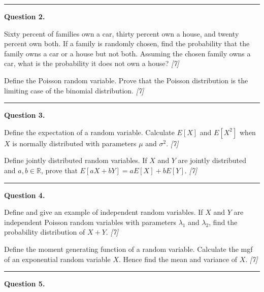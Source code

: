 \documentclass[11pt,a4paper]{article}
\newcommand{\pts}[1]{\hfill   \textit{[#1]}}
\begin{document}
\medskip\rule{\linewidth}{0.2pt}

\medskip


\noindent   \textbf{Question 2.}

\begin{parts}
  \item Sixty percent of families own a car, thirty percent own a house, and twenty percent own both. If a family is randomly chosen, find the probability that the family owns a car or a house but not both. Assuming the chosen family owns a car, what is the probability it does not own a house? \pts{7}
  \item Define the Poisson random variable. Prove that the Poisson distribution is the limiting case of the binomial distribution. \pts{7}
\end{parts}

\medskip\rule{\linewidth}{0.2pt}

\medskip


\noindent   \textbf{Question 3.}

\begin{parts}
  \item Define the expectation of a random variable. Calculate $E[X]$ and $E[X^2]$ when $X$ is normally distributed with parameters $\mu$ and $\sigma^2$. \pts{7}
  \item Define jointly distributed random variables. If $X$ and $Y$ are jointly distributed and $a, b \in \mathbb{R}$, prove that $E[aX + bY] = aE[X] + bE[Y]$. \pts{7}
\end{parts}

\medskip\rule{\linewidth}{0.2pt}

\medskip


\noindent   \textbf{Question 4.}

\begin{parts}
  \item Define and give an example of independent random variables. If $X$ and $Y$ are independent Poisson random variables with parameters $\lambda_1$ and $\lambda_2$, find the probability distribution of $X + Y$. \pts{7}
  \item Define the moment generating function of a random variable. Calculate the mgf of an exponential random variable $X$. Hence find the mean and variance of $X$. \pts{7}
\end{parts}

\medskip\rule{\linewidth}{0.2pt}

\medskip


\noindent   \textbf{Question 5.}
\end{document}
